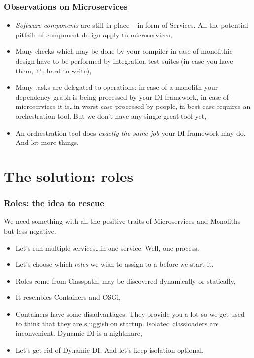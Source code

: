 \documentclass[usenames,dvipsnames]{beamer}
\begin{document}
\begin{frame}
\frametitle{Observations on Microservices}
\begin{itemize}
\item \textit{Software components} are still in place -- in form of Services.
      All the potential pitfails of component design apply to microservices,
\item Many checks which may be done by your compiler in case of monolithic design have  
     to be performed by integration test suites (in case you have them, it's hard to write),   
\item Many tasks are delegated to operations: in case of a monolith your dependency graph is being 
      processed by your DI framework\footnotemark[1], in case of microservices it is\dots in worst case processed by people,
      in best case requires an orchestration tool. But we don't have any single great tool yet,
\item An orchestration tool does \textit{exactly the same job} your DI framework may do. And lot more things.
\end{itemize}
\end{frame}

\section{The solution: roles}

\begin{frame}
\frametitle{Roles: the idea to rescue}
We need something with all the positive traits of Microservices and Monoliths but less negative.
\vspace{0.3cm}
\begin{itemize}
\item Let's run multiple services\dots in one service. Well, one process,
\item Let's choose which \textit{roles} we wish to assign to a before we start it,
\item Roles come from Classpath, may be discovered dynamically or statically,
\item It resembles Containers and OSGi,
\item Containers have some disadvantages. 
      They provide you a lot so we get used to think that they are sluggish on startup.
      Isolated classloaders are inconvenient. Dynamic DI is a nightmare,
\item Let's get rid of Dynamic DI. And let's keep isolation optional.
\end{itemize}
\end{frame}
\end{document}
